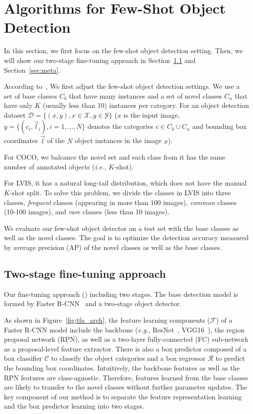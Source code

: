 \vspace{-0.3cm}
\section{Algorithms for Few-Shot Object Detection}

In this section, we first focus on the few-shot object detection setting. Then, we will show our two-stage fine-tuning approach in
Section~\ref{sec:tfa} and Section~\ref{sec:meta}.

According to~\citet{kang2019few}, We first adjust the few-shot object detection settings. We use a set of base
classes $C_b$ that have many instances and a set of novel classes $C_n$ that
have only $K$ (usually less than 10) instances per category.
For an object detection dataset $\mathcal{D}=\{(x, y), x\in\mathcal{X}, y\in\mathcal{Y}\}$ ($x$
is the input image, $y=\{(c_i, \vec{l}_i), i=1, ...,N\}$ denotes the categories $c \in C_b \cup C_n$
and bounding box coordinates $\vec{l}$ of the $N$ object instances in the image $x$).

For COCO, we balcance the novel set and each class from it has the same number of 
annotated objects (\textit{i.e.}, $K$-shot). 

For LVIS, it has a natural long-tail distribution, which does
not have the manual $K$-shot split. To solve this problem, we divide the classes in LVIS into three classes, \emph{frequent} classes
(appearing in more than 100 images), \emph{common} classes (10-100 images), and \emph{rare}
classes (less than 10 images).

We evaluate our few-shot object detector on a test set with the base classes as well as
the novel classes. The goal is to optimize the detection accuracy measured by average precision (AP)
of the novel classes as well as the base classes.

\subsection{Two-stage fine-tuning approach}
\label{sec:tfa}
Our fine-tuning approach (\model) including two stages. The base detection model is formed by Faster R-CNN~\cite{ren2015faster} and a two-stage object
detector. 

As shown in Figure~\ref{fig:tfa_arch}, the feature learning components ($\mathcal{F}$) of a Faster R-CNN model include the backbone (\textit{e.g.}, ResNet~\cite{he2016deep}, VGG16~\cite{simonyan2014very}), the region proposal network (RPN), as well as a two-layer
fully-connected (FC) sub-network as a proposal-level feature extractor. 
There is also a box predictor composed of a box classifier $\mathcal{C}$ to classify the
object categories and a box regressor $\mathcal{R}$ to predict the bounding box coordinates. 
Intuitively, the backbone features as well as the RPN features
are class-agnostic. Therefore, features learned from the base classes are likely to transfer
to the novel classes without further parameter updates. The key component of our method is to separate the
feature representation learning and the box predictor learning into two stages. 

